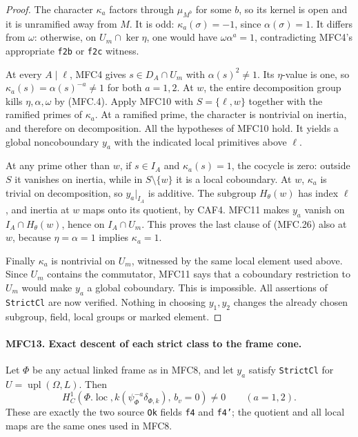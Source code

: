 \documentclass[11pt,a4paper]{article}
\numberwithin{equation}{section}
\theoremstyle{remark}\newtheorem{remark}[theorem]{Remark}
\begin{document}
\begin{proof}
The character \(\kappa_a\) factors through \(\mu_{M^b}\)
for some \(b\), so its kernel is open and it is unramified
away from \(M\).  It is odd:
\(\kappa_a(\sigma)=-1\), since \(\alpha(\sigma)=1\).
It differs from \(\omega\): otherwise, on
\(U_m\cap\ker\eta\), one would have
\(\omega\alpha^a=1\), contradicting MFC4's appropriate
\texttt{f2b} or \texttt{f2c} witness.

At every \(A\mid\ell\), MFC4 gives \(s\in D_A\cap U_m\)
with \(\alpha(s)^2\ne1\).  Its \(\eta\)-value is one,
so \(\kappa_a(s)=\alpha(s)^{-a}\ne1\) for both \(a=1,2\).
At \(w\), the entire decomposition group kills
\(\eta,\alpha,\omega\) by (MFC.4).  Apply MFC10 with
\(S=\{\ell,w\}\) together with the ramified primes of
\(\kappa_a\).  At a ramified prime, the character is
nontrivial on inertia, and therefore on decomposition.  All
the hypotheses of MFC10 hold.  It yields a global noncoboundary
\(y_a\) with the indicated local primitives above \(\ell\).

At any prime other than \(w\), if
\(s\in I_A\) and \(\kappa_a(s)=1\), the cocycle is zero:
outside \(S\) it vanishes on inertia, while in
\(S\setminus\{w\}\) it is a local coboundary.
At \(w\), \(\kappa_a\) is trivial on decomposition, so
\(y_a|_{I_A}\) is additive.  The subgroup \(H_\theta(w)\)
has index \(\ell\), and inertia at \(w\) maps onto its
quotient, by CAF4.  MFC11 makes \(y_a\) vanish on
\(I_A\cap H_\theta(w)\), hence on \(I_A\cap U_m\).
This proves the last clause of (MFC.26) also at \(w\),
because \(\eta=\alpha=1\) implies \(\kappa_a=1\).

Finally \(\kappa_a\) is nontrivial on \(U_m\), witnessed
by the same local element used above.  Since \(U_m\) contains
the commutator, MFC11 says that a coboundary restriction to
\(U_m\) would make \(y_a\) a global coboundary.  This is
impossible.  All assertions of \texttt{Strict\allowbreak Cl} are now verified.
Nothing in choosing \(y_1,y_2\) changes the already chosen
subgroup, field, local groups or marked element.
\end{proof}

\paragraph{MFC13. Exact descent of each strict class to the frame cone.}
\label{claim:MFC13}
Let \(\Phi\) be any actual linked frame as in MFC8, and let
\(y_a\) satisfy \texttt{Strict\allowbreak Cl} for \(U=\operatorname{upl}(\Omega,L)\).
Then
\[
 H^1_C\!\left(\Phi.\operatorname{loc},
    k(\psi_\Phi^{-a}\delta_{\Phi,k}),\,b_v=0\right)
                         \ne0\qquad(a=1,2).               \tag{MFC.27}
\]
These are exactly the two source \texttt{Ok} fields
\texttt{f4} and \texttt{f4'}; the quotient and all local
maps are the same ones used in MFC8.
\end{document}

